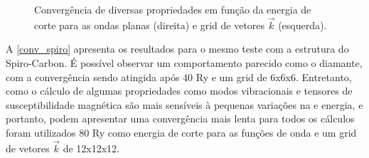 \documentclass[
	12pt,				%
	openright,			%
	twoside,			%
	a4paper,			%
	chapter=TITLE,		%
	english,			%
	french,				%
	spanish,			%
	brazil				%
	]{abntex2}
\begin{document}
\begin{apendicesenv}
		\begin{figure}[!h]
			\centering
			\caption{Convergência de diversas propriedades em função da energia de corte para as ondas planas (direita) e grid de vetores $\vec{k}$ (esquerda).}
			\label{conv_diamante}
		\end{figure}
		
		A \autoref{conv_spiro} apresenta os resultados para o mesmo teste com a estrutura do Spiro-Carbon. É possível observar um comportamento parecido como o diamante, com a convergência sendo atingida após 40 Ry e um grid de 6x6x6. Entretanto, como o cálculo de algumas propriedades como modos vibracionais e tensores de susceptibilidade magnética são mais sensíveis à pequenas variações na e energia, e portanto, podem apresentar uma convergência mais lenta para todos os cálculos foram utilizados 80 Ry como energia de corte para as funções de onda e um grid de vetores $\vec{k}$ de 12x12x12.
	

\end{apendicesenv}
\end{document}
